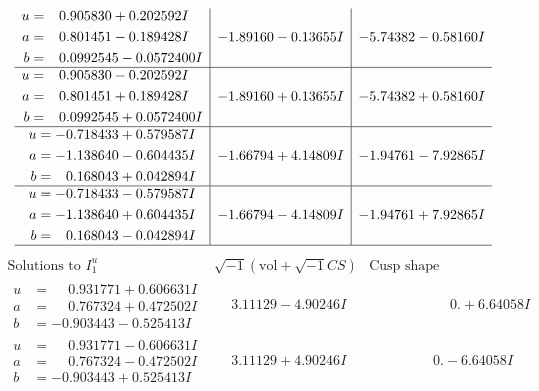 \documentclass[1p]{elsarticle_modified}
\theoremstyle{definition}
\newcommand{\I}{\sqrt{-1}}
\begin{document}
$$\begin{array}{c|c|c}
\begin{aligned}
u &= \phantom{-}0.905830 + 0.202592 I \\
a &= \phantom{-}0.801451 - 0.189428 I \\
b &= \phantom{-}0.0992545 - 0.0572400 I\end{aligned}
 & -1.89160 - 0.13655 I & -5.74382 - 0.58160 I \\ \hline\begin{aligned}
u &= \phantom{-}0.905830 - 0.202592 I \\
a &= \phantom{-}0.801451 + 0.189428 I \\
b &= \phantom{-}0.0992545 + 0.0572400 I\end{aligned}
 & -1.89160 + 0.13655 I & -5.74382 + 0.58160 I \\ \hline\begin{aligned}
u &= -0.718433 + 0.579587 I \\
a &= -1.138640 - 0.604435 I \\
b &= \phantom{-}0.168043 + 0.042894 I\end{aligned}
 & -1.66794 + 4.14809 I & -1.94761 - 7.92865 I \\ \hline\begin{aligned}
u &= -0.718433 - 0.579587 I \\
a &= -1.138640 + 0.604435 I \\
b &= \phantom{-}0.168043 - 0.042894 I\end{aligned}
 & -1.66794 - 4.14809 I & -1.94761 + 7.92865 I\\
 \hline 
 \end{array}$$\newpage$$\begin{array}{c|c|c}  
\text{Solutions to }I^u_{1}& \I (\text{vol} + \sqrt{-1}CS) & \text{Cusp shape}\\
 \hline 
\begin{aligned}
u &= \phantom{-}0.931771 + 0.606631 I \\
a &= \phantom{-}0.767324 + 0.472502 I \\
b &= -0.903443 - 0.525413 I\end{aligned}
 & \phantom{-}3.11129 - 4.90246 I & \phantom{-0.000000 -}0. + 6.64058 I \\ \hline\begin{aligned}
u &= \phantom{-}0.931771 - 0.606631 I \\
a &= \phantom{-}0.767324 - 0.472502 I \\
b &= -0.903443 + 0.525413 I\end{aligned}
 & \phantom{-}3.11129 + 4.90246 I & \phantom{-0.000000 } 0. - 6.64058 I \\ \hline\begin{aligned}

\end{aligned}
\end{array}$$
\end{document}

